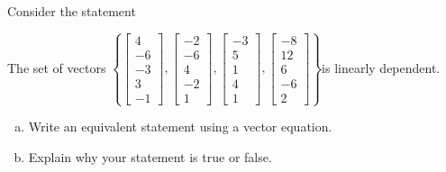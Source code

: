 
\begin{exerciseStatement}


Consider the statement 
\begin{center}\begin{minipage}{0.8\textwidth}
 The set of vectors \( \left\{ \left[\begin{array}{c}
4 \\
-6 \\
-3 \\
3 \\
-1
\end{array}\right] , \left[\begin{array}{c}
-2 \\
-6 \\
4 \\
-2 \\
1
\end{array}\right] , \left[\begin{array}{c}
-3 \\
5 \\
1 \\
4 \\
1
\end{array}\right] , \left[\begin{array}{c}
-8 \\
12 \\
6 \\
-6 \\
2
\end{array}\right] \right\} \)is linearly dependent.
\end{minipage}\end{center}
    


\begin{enumerate}[(a)]
\item  Write an equivalent statement using a vector equation.
\item  Explain why your statement is true or false.
\end{enumerate}
    
\end{exerciseStatement}
    
